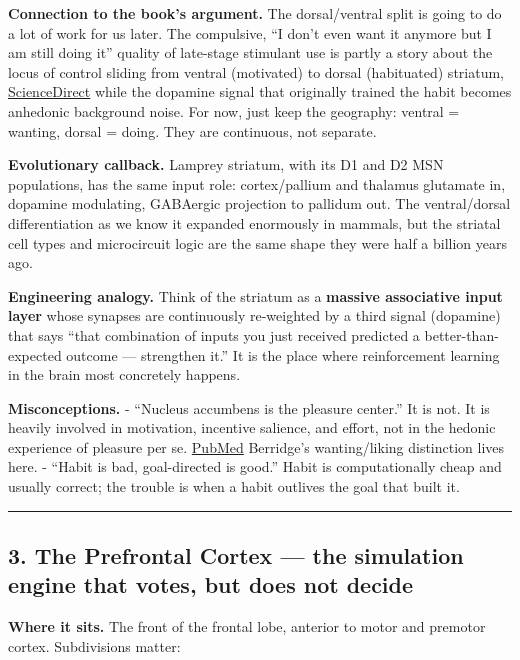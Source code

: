 \textbf{Connection to the book's argument.} The dorsal/ventral split is going to do a lot of work for us later. The compulsive, ``I don't even want it anymore but I am still doing it'' quality of late-stage stimulant use is partly a story about the locus of control sliding from ventral (motivated) to dorsal (habituated) striatum, \href{https://www.sciencedirect.com/science/article/pii/S0149763413000468}{ScienceDirect} while the dopamine signal that originally trained the habit becomes anhedonic background noise. For now, just keep the geography: ventral = wanting, dorsal = doing. They are continuous, not separate.

\textbf{Evolutionary callback.} Lamprey striatum, with its D1 and D2 MSN populations, has the same input role: cortex/pallium and thalamus glutamate in, dopamine modulating, GABAergic projection to pallidum out. The ventral/dorsal differentiation as we know it expanded enormously in mammals, but the striatal cell types and microcircuit logic are the same shape they were half a billion years ago.

\textbf{Engineering analogy.} Think of the striatum as a \textbf{massive associative input layer} whose synapses are continuously re-weighted by a third signal (dopamine) that says ``that combination of inputs you just received predicted a better-than-expected outcome --- strengthen it.'' It is the place where reinforcement learning in the brain most concretely happens.

\textbf{Misconceptions.} - ``Nucleus accumbens is the pleasure center.'' It is not. It is heavily involved in motivation, incentive salience, and effort, not in the hedonic experience of pleasure per se. \href{https://pubmed.ncbi.nlm.nih.gov/17225164/}{PubMed} Berridge's wanting/liking distinction lives here. - ``Habit is bad, goal-directed is good.'' Habit is computationally cheap and usually correct; the trouble is when a habit outlives the goal that built it.

\begin{center}\rule{0.5\linewidth}{0.5pt}\end{center}

\subsection{3. The Prefrontal Cortex --- the simulation engine that votes, but does not decide}\label{06_neurology_101-the-prefrontal-cortex-the-simulation-engine-that-votes-but-does-not-decide}

\textbf{Where it sits.} The front of the frontal lobe, anterior to motor and premotor cortex. Subdivisions matter:

